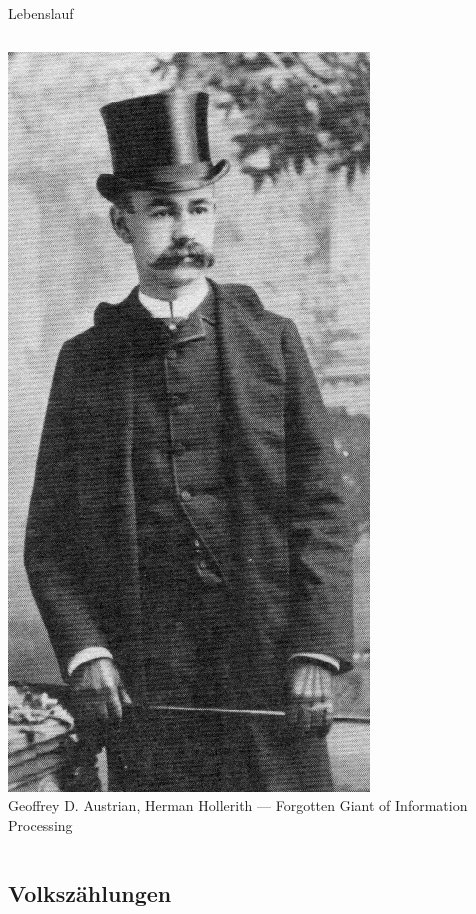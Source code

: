 \documentclass[EU2]{beamer}
\begin{document}
\begin{frame}{Lebenslauf}
\begin{columns}
      \includegraphics[height=0.8\textheight]{hollerith}\\
      \tiny{Geoffrey D. Austrian, Herman Hollerith — Forgotten Giant of Information Processing}
  \end{columns}
\end{frame}

\subsection{Volkszählungen}
\end{document}
